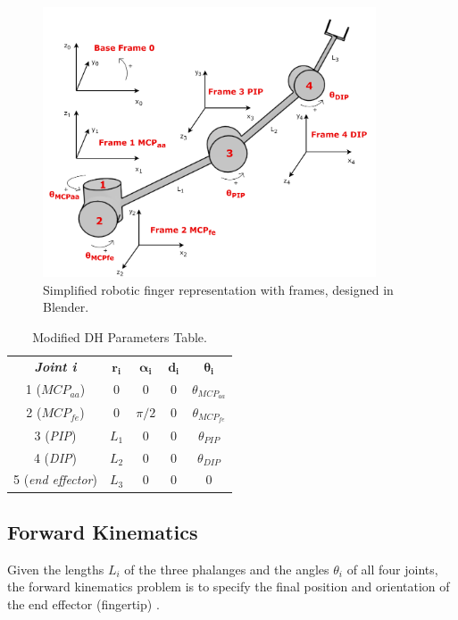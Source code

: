 \documentclass[a4paper,12pt]{article}
\begin{document}
\begin{figure}[htbp]
    \centering
    \includegraphics[width=0.88\textwidth]{img/blender_axes2.png}
    \caption{Simplified robotic finger representation with frames, designed in Blender.}
    \label{fig:blender_axes}
\end{figure}

\renewcommand{\arraystretch}{1.5} %
\begin{table}[h]
\centering
\caption{Modified DH Parameters Table.}
\label{tab:dh_parameters}
\vspace{1pt}
\begin{tabular}{|c|c|c|c|c|}
\hline
\textit{\textbf{Joint i}} & $\boldsymbol{r_{i}}$ & $\boldsymbol{\alpha_{i}}$ & $\boldsymbol{d_i}$ & $\boldsymbol{\theta_i}$ \\ \hhline{|=|=|=|=|=|}
1 (\textit{$MCP_{aa}$}) & 0 & 0 & 0 & $\theta_{MCP_{aa}}$ \\ \hline
2 (\textit{$MCP_{fe}$}) & 0 & $\pi/2$ & 0 & $\theta_{MCP_{fe}}$ \\ \hline
3 (\textit{PIP}) & $L_1$ & 0 & 0 & $\theta_{PIP}$ \\ \hline
4 (\textit{DIP}) & $L_2$ & 0 & 0 & $\theta_{DIP}$ \\ \hline
5 (\textit{end effector}) & $L_3$ & 0 & 0 & 0 \\ \hline
\end{tabular}
\end{table}


\subsection{Forward Kinematics}
Given the lengths $L_{i}$ of the three phalanges and the angles $\theta_{i}$ of all four joints, the forward kinematics problem is to specify the final position and orientation of the end effector (fingertip) \cite{borghesan2010design, CheckValidAngles_BEST_chen2013constraint, BEST_li2022kinematic, chen2014human, tsakonas2024parameter, ueda2024development}.
\end{document}
